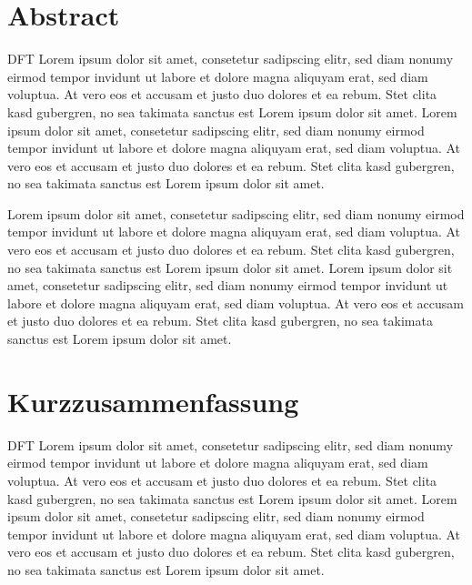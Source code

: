 \chapter*{Abstract}
\singlespacing %
    \Ac{DFT} Lorem ipsum dolor sit amet, consetetur sadipscing elitr, sed diam nonumy eirmod tempor invidunt ut labore et dolore magna aliquyam erat, sed diam voluptua.
    At vero eos et accusam et justo duo dolores et ea rebum.
    Stet clita kasd gubergren, no sea takimata sanctus est Lorem ipsum dolor sit amet.
    Lorem ipsum dolor sit amet, consetetur sadipscing elitr, sed diam nonumy eirmod tempor invidunt ut labore et dolore magna aliquyam erat, sed diam voluptua.
    At vero eos et accusam et justo duo dolores et ea rebum.
    Stet clita kasd gubergren, no sea takimata sanctus est Lorem ipsum dolor sit amet. \medskip
    
    \noindent  Lorem ipsum dolor sit amet, consetetur sadipscing elitr, sed diam nonumy eirmod tempor invidunt ut labore et dolore magna aliquyam erat, sed diam voluptua.
    At vero eos et accusam et justo duo dolores et ea rebum.
    Stet clita kasd gubergren, no sea takimata sanctus est Lorem ipsum dolor sit amet.
    Lorem ipsum dolor sit amet, consetetur sadipscing elitr, sed diam nonumy eirmod tempor invidunt ut labore et dolore magna aliquyam erat, sed diam voluptua.
    At vero eos et accusam et justo duo dolores et ea rebum.
    Stet clita kasd gubergren, no sea takimata sanctus est Lorem ipsum dolor sit amet. \medskip
    


\begingroup
{}

\chapter*{Kurzzusammenfassung}
    \Ac{DFT} Lorem ipsum dolor sit amet, consetetur sadipscing elitr, sed diam nonumy eirmod tempor invidunt ut labore et dolore magna aliquyam erat, sed diam voluptua.
    At vero eos et accusam et justo duo dolores et ea rebum.
    Stet clita kasd gubergren, no sea takimata sanctus est Lorem ipsum dolor sit amet.
    Lorem ipsum dolor sit amet, consetetur sadipscing elitr, sed diam nonumy eirmod tempor invidunt ut labore et dolore magna aliquyam erat, sed diam voluptua.
    At vero eos et accusam et justo duo dolores et ea rebum.
    Stet clita kasd gubergren, no sea takimata sanctus est Lorem ipsum dolor sit amet. \medskip
    
